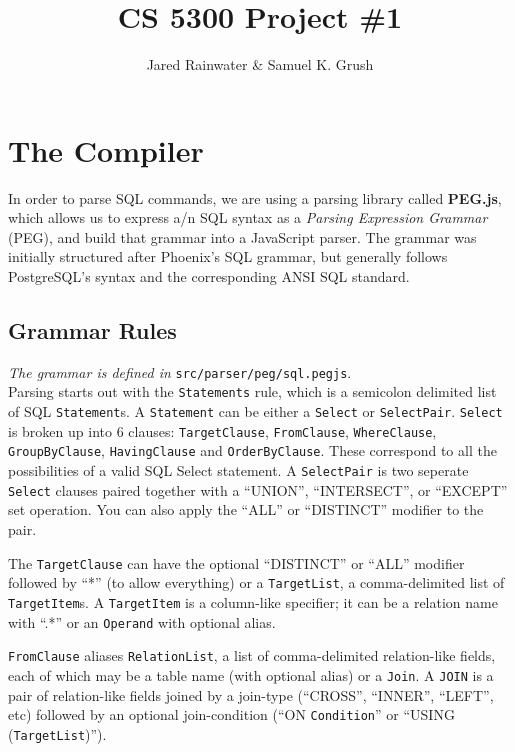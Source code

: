 \documentclass{article}
\title{CS 5300 Project \#1}
\author{Jared Rainwater \& Samuel K. Grush}
\begin{document}
\maketitle

\tableofcontents

\section{The Compiler}

In order to parse SQL commands, we are using a parsing library called \textbf{PEG.js},
which allows us to express a/n SQL syntax as a \emph{Parsing Expression Grammar} (PEG),
and build that grammar into a JavaScript parser.
The grammar was initially structured after Phoenix's SQL grammar,
but generally follows PostgreSQL's syntax and the corresponding ANSI SQL standard.

\subsection{Grammar Rules}

\emph{The grammar is defined in} \verb|src/parser/peg/sql.pegjs|. \\

Parsing starts out with the \verb|Statements| rule, which is a semicolon
delimited list of SQL \verb|Statement|s.
A \verb|Statement| can be either a \verb|Select| or \verb|SelectPair|.
\verb|Select| is broken up into 6 clauses: \verb|TargetClause|, \verb|FromClause|,
\verb|WhereClause|, \verb|GroupByClause|, \verb|HavingClause| and \verb|OrderByClause|.
These correspond to all the possibilities of a valid SQL Select statement.
A \verb|SelectPair| is two seperate \verb|Select| clauses paired together with a
``UNION'', ``INTERSECT'', or ``EXCEPT'' set operation.
You can also apply the ``ALL'' or ``DISTINCT'' modifier to the pair.

The \verb|TargetClause| can have the optional ``DISTINCT'' or ``ALL'' modifier
followed by ``*'' (to allow everything) or a \verb|TargetList|, a
comma-delimited list of \verb|TargetItem|s.
A \verb|TargetItem| is a column-like specifier; it can be a relation name with ``.*''
or an \verb|Operand| with optional alias.

\verb|FromClause| aliases \verb|RelationList|, a list of comma-delimited
relation-like fields, each of which may be a table name (with optional alias)
or a \verb|Join|. A \verb|JOIN| is a pair of relation-like fields joined by
a join-type (``CROSS'', ``INNER'', ``LEFT'', etc) followed by an optional
join-condition (``ON \verb|Condition|'' or ``USING (\verb|TargetList|)'').
\end{document}
